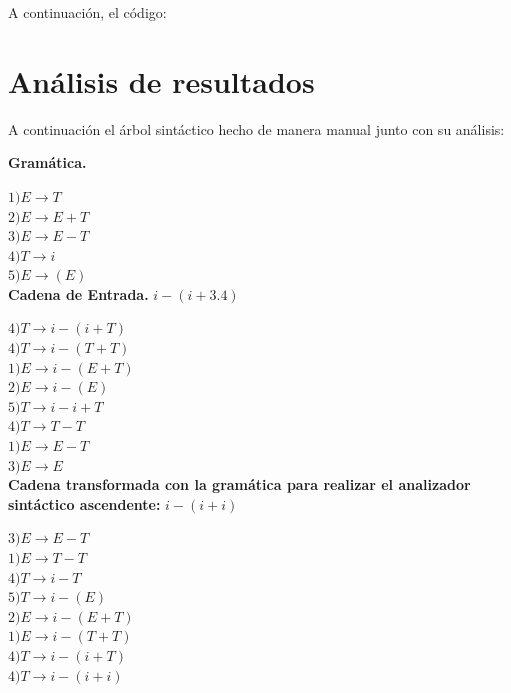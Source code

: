 \documentclass[letterpaper]{article}
\begin{document}
A continuación, el código:



\section{Análisis de resultados}
A continuación el árbol sintáctico hecho de manera manual junto con su análisis:

\textbf{Gramática.}

$1) E \rightarrow T$ \\
$2) E \rightarrow E + T$ \\
$3) E \rightarrow E - T$ \\
$4) T \rightarrow i$ \\
$5) E \rightarrow (E)$ \\

\textbf{Cadena de Entrada.}
$i-(i+3.4)$

$4) T \rightarrow i - (i + T)$ \\
$4) T \rightarrow i - (T + T)$ \\
$1) E \rightarrow i - (E + T)$ \\
$2) E \rightarrow i - (E)$ \\
$5) T \rightarrow i - i + T$ \\
$4) T \rightarrow T - T $ \\
$1) E \rightarrow E - T$ \\
$3) E \rightarrow E$ \\

\textbf{Cadena transformada con la gramática para realizar el analizador sintáctico ascendente:}
$i-(i +i)$

$3) E \rightarrow E - T$ \\
$1) E \rightarrow T - T$ \\
$4) T \rightarrow i - T$ \\
$5) T \rightarrow i - (E)$ \\
$2) E \rightarrow i - (E + T)$ \\
$1) E \rightarrow i - (T + T)$ \\
$4) T \rightarrow i - (i + T)$ \\
$4) T \rightarrow i - (i + i)$ \\
\end{document}
